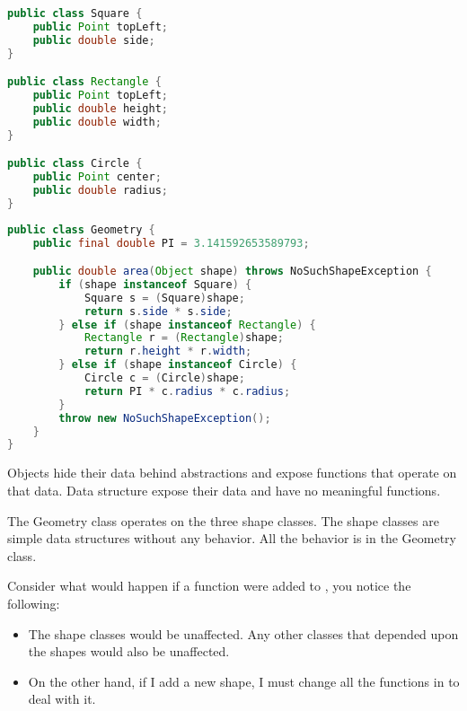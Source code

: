 \begin{tcolorbox}[breakable, colback=green!10!white, colframe=green!85!black, sidebyside, label = object-and-data-structure-procedure-pair]

\begin{lstlisting}[language = java, basicstyle=\small]
public class Square {
    public Point topLeft;
    public double side;
}

public class Rectangle {
    public Point topLeft;
    public double height;
    public double width;
}

public class Circle {
    public Point center;
    public double radius;
}
\end{lstlisting}

\tcblower

\begin{lstlisting}[language = java, basicstyle=\small]
public class Geometry {
    public final double PI = 3.141592653589793;

    public double area(Object shape) throws NoSuchShapeException {
        if (shape instanceof Square) {
            Square s = (Square)shape;
            return s.side * s.side;
        } else if (shape instanceof Rectangle) {
            Rectangle r = (Rectangle)shape;
            return r.height * r.width;
        } else if (shape instanceof Circle) {
            Circle c = (Circle)shape;
            return PI * c.radius * c.radius;
        }
        throw new NoSuchShapeException();
    }
}
\end{lstlisting}
\end{tcolorbox}

Objects hide their data behind abstractions and expose functions that operate on that data. Data structure expose their data and have no meaningful functions.

The Geometry class operates on the three shape classes. The shape classes are simple data structures without any behavior. All the behavior is in the Geometry class.

Consider what would happen if a  function were added to , you notice the following:

\begin{itemize}
    \item The shape classes would be unaffected. Any other classes that depended upon the shapes would also be unaffected.
    \item On the other hand, if I add a new shape, I must change all the functions in  to deal with it.
\end{itemize}


